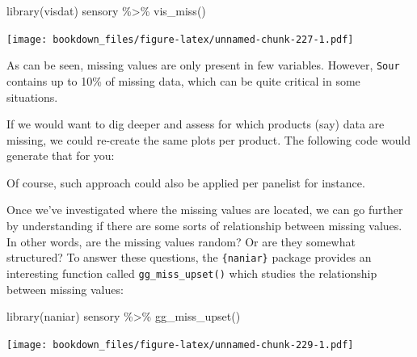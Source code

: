 \documentclass[
]{krantz}
\makeatletter
\newenvironment{Shaded}{\begin{snugshade}}{\end{snugshade}}
\newcommand{\ControlFlowTok}[1]{\textcolor[rgb]{0.27,0.27,0.27}{\textbf{#1}}}
\newcommand{\FunctionTok}[1]{\textcolor[rgb]{0,0,0}{#1}}
\newcommand{\NormalTok}[1]{#1}
\newcommand{\SpecialCharTok}[1]{\textcolor[rgb]{0,0,0}{#1}}
\newenvironment{kframe}{%
\medskip{}
\setlength{\fboxsep}{.8em}
 \def\at@end@of@kframe{}%
 \ifinner\ifhmode%
  \def\at@end@of@kframe{\end{minipage}}%
  \begin{minipage}{\columnwidth}%
 \fi\fi%
 \def\FrameCommand##1{\hskip\@totalleftmargin \hskip-\fboxsep
 \colorbox{shadecolor}{##1}\hskip-\fboxsep
     \hskip-\linewidth \hskip-\@totalleftmargin \hskip\columnwidth}%
 \MakeFramed {\advance\hsize-\width
   \@totalleftmargin\z@ \linewidth\hsize
   \@setminipage}}%
 {\par\unskip\endMakeFramed%
 \at@end@of@kframe}
\renewenvironment{Shaded}{\begin{kframe}}{\end{kframe}}
\makeatother
\begin{document}
\begin{Shaded}
\begin{Highlighting}[]
\FunctionTok{library}\NormalTok{(visdat)}
\NormalTok{sensory }\SpecialCharTok{\%\textgreater{}\%} 
  \FunctionTok{vis\_miss}\NormalTok{()}
\end{Highlighting}
\end{Shaded}

\texttt{[image: bookdown\_files/figure-latex/unnamed-chunk-227-1.pdf]}

As can be seen, missing values are only present in few variables. However, \texttt{Sour} contains up to 10\% of missing data, which can be quite critical in some situations.

If we would want to dig deeper and assess for which products (say) data are missing, we could re-create the same plots per product. The following code would generate that for you:

\begin{Shaded}
\end{Shaded}

Of course, such approach could also be applied per panelist for instance.

Once we've investigated where the missing values are located, we can go further by understanding if there are some sorts of relationship between missing values. In other words, are the missing values random? Or are they somewhat structured?
To answer these questions, the \texttt{\{naniar\}} package provides an interesting function called \texttt{gg\_miss\_upset()} which studies the relationship between missing values:

\begin{Shaded}
\begin{Highlighting}[]
\FunctionTok{library}\NormalTok{(naniar)}
\NormalTok{sensory }\SpecialCharTok{\%\textgreater{}\%}
  \FunctionTok{gg\_miss\_upset}\NormalTok{()}
\end{Highlighting}
\end{Shaded}

\texttt{[image: bookdown\_files/figure-latex/unnamed-chunk-229-1.pdf]}
\end{document}
